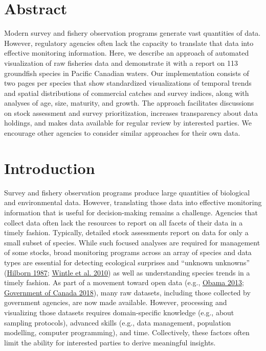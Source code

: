 \documentclass[12pt,]{article}
\begin{document}
\hypertarget{abstract}{%
\section*{Abstract}\label{abstract}}

Modern survey and fishery observation programs generate vast quantities of
data. However, regulatory agencies often lack the capacity to translate that
data into effective monitoring information. Here, we describe an approach of
automated visualization of raw fisheries data and demonstrate it with a
report on 113 groundfish species in Pacific Canadian
waters. Our implementation consists of two pages per species that show
standardized visualizations of temporal
trends and spatial distributions of commercial catches and survey indices,
along with analyses of age, size, maturity, and growth. The approach
facilitates discussions on stock assessment and survey prioritization,
increases transparency about data holdings, and makes data available for
regular review by interested parties. We encourage other agencies to consider
similar approaches for their own data.

\hypertarget{introduction}{%
\section*{Introduction}\label{introduction}}

Survey and fishery observation programs produce large quantities of biological and environmental data. However, translating those data into effective monitoring information that is useful for decision-making remains a challenge. Agencies that collect data often lack the resources to report on all facets of their data in a timely fashion. Typically, detailed stock assessments report on data for only a small subset of species. While such focused analyses are required for management of some stocks, broad monitoring programs across an array of species and data types are essential for detecting ecological surprises and ``unknown unknowns'' (\protect\hyperlink{ref-hilborn1987}{Hilborn 1987}; \protect\hyperlink{ref-wintle2010}{Wintle et al. 2010}) as well as understanding species trends in a timely fashion. As part of a movement toward open data (e.g., \protect\hyperlink{ref-obama2013}{Obama 2013}; \protect\hyperlink{ref-canada2018}{Government of Canada 2018}), many raw datasets, including those collected by government agencies, are now made available. However, processing and visualizing those datasets requires domain-specific knowledge (e.g., about sampling protocols), advanced skills (e.g., data management, population modelling, computer programming), and time. Collectively, these factors often limit the ability for interested parties to derive meaningful insights.
\end{document}
